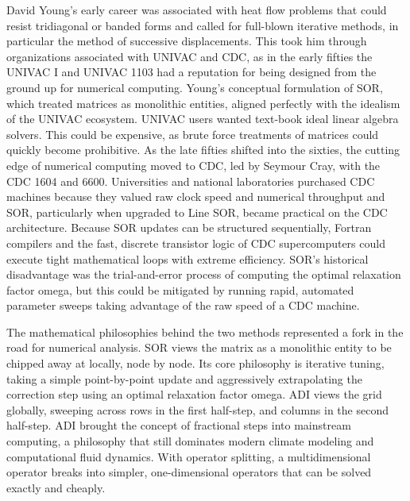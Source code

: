 David Young’s early career was associated with heat flow problems that could resist tridiagonal or banded forms and called for full-blown iterative methods, in particular the method of successive displacements. This took him through organizations associated with UNIVAC and CDC, as in the early fifties the UNIVAC I and UNIVAC 1103 had a reputation for being designed from the ground up for numerical computing. Young’s conceptual formulation of SOR, which treated matrices as monolithic entities, aligned perfectly with the idealism of the UNIVAC ecosystem. UNIVAC users wanted text-book ideal linear algebra solvers. This could be expensive, as brute force treatments of matrices could quickly become prohibitive. As the late fifties shifted into the sixties, the cutting edge of numerical computing moved to CDC, led by Seymour Cray, with the CDC 1604 and 6600. Universities and national laboratories purchased CDC machines because they valued raw clock speed and numerical throughput and SOR, particularly when upgraded to Line SOR, became practical on the CDC architecture. Because SOR updates can be structured sequentially, Fortran compilers and the fast, discrete transistor logic of CDC supercomputers could execute tight mathematical loops with extreme efficiency. SOR’s historical disadvantage was the trial-and-error process of computing the optimal relaxation factor omega, but this could be mitigated by running rapid, automated parameter sweeps taking advantage of the raw speed of a CDC machine.

The mathematical philosophies behind the two methods represented a fork in the road for numerical analysis. SOR views the matrix as a monolithic entity to be chipped away at locally, node by node. Its core philosophy is iterative tuning, taking a simple point-by-point update and aggressively extrapolating the correction step using an optimal relaxation factor omega. ADI views the grid globally, sweeping across rows in the first half-step, and columns in the second half-step. ADI brought the concept of fractional steps into mainstream computing, a philosophy that still dominates modern climate modeling and computational fluid dynamics. With operator splitting, a multidimensional operator breaks into simpler, one-dimensional operators that can be solved exactly and cheaply.

